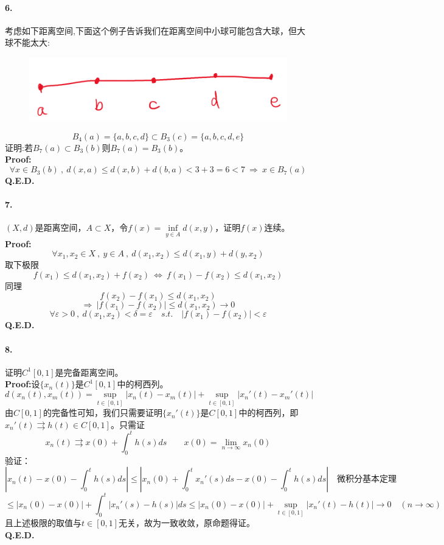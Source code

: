 \paragraph*{6.}考虑如下距离空间,下面这个例子告诉我们在距离空间中小球可能包含大球，但大球不能太大:
\begin{figure}[htbp]
    \center
    \includegraphics[scale=0.2]{./fig/ex-1.png}
\end{figure}
\[B_4(a)=\{a,b,c,d\} \subset B_3(c)=\{a,b,c,d,e\}\]
证明:若$B_7(a) \subset B_3(b)$则$B_7(a)=B_3(b)$。\\
\textbf{Proof:}
\[\forall x \in B_3(b) \ , \ d(x,a) \leq d(x,b)+d(b,a)<3+3=6<7 \ \Rightarrow \ x \in B_7(a)\]
\textbf{Q.E.D.}

\paragraph*{7.}$(X,d)$是距离空间，$A \subset X$，令$f(x)=\mathop \text{inf}\limits_{y \in A}d(x,y)$，证明$f(x)$连续。\\
\textbf{Proof:}
\[\forall x_1,x_2 \in X \ , \ y \in A \ , \ d(x_1,x_2) \leq d(x_1,y)+d(y,x_2)\]
取下极限
\[f(x_1) \leq d(x_1,x_2)+f(x_2) \ \Leftrightarrow \ f(x_1)-f(x_2) \leq d(x_1,x_2)\]
同理
\[f(x_2)-f(x_1) \leq d(x_1,x_2)\]
\[\Rightarrow \ |f(x_1)-f(x_2)| \leq d(x_1,x_2) \to 0\]
\[\forall \varepsilon>0 \ , \ d(x_1,x_2)<\delta=\varepsilon \quad s.t. \quad |f(x_1)-f(x_2)|<\varepsilon\]
\textbf{Q.E.D.}

\paragraph*{8.}证明$C^1[0,1]$是完备距离空间。\\
\textbf{Proof:}设$\{x_n(t)\}$是$C^1[0,1]$中的柯西列。
\[d(x_n(t),x_m(t))=\mathop \text{sup}\limits_{t \in [0,1]}|x_n(t)-x_m(t)|+\mathop \text{sup}\limits_{t \in [0,1]}|x_n'(t)-x_m'(t)|\]
由$C[0,1]$的完备性可知，我们只需要证明$\{x_n'(t)\}$是$C[0,1]$中的柯西列，即$x_n'(t) \rightrightarrows h(t) \in C[0,1]$。只需证
\[x_n(t) \rightrightarrows x(0)+\int_0^th(s)ds \qquad x(0)=\lim_{n \to \infty}x_n(0)\]
验证：
\[\left|x_n(t)-x(0)-\int_0^th(s)ds\right| \leq \left|x_n(0)+\int_0^tx_n'(s)ds-x(0)-\int_0^th(s)ds\right| \quad \text{微积分基本定理}\]
\[\leq \left|x_n(0)-x(0)\right|+\int_0^t|x_n'(s)-h(s)|ds \leq \left|x_n(0)-x(0)\right|+\mathop \text{sup}\limits_{t \in [0,1]}|x_n'(t)-h(t)| \to 0 \quad (n \to \infty)\]
且上述极限的取值与$t \in [0,1]$无关，故为一致收敛，原命题得证。\\
\textbf{Q.E.D.}

